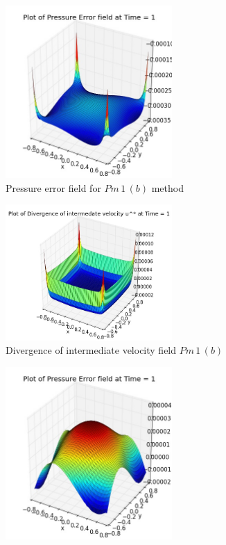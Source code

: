 \begin{figure}[H]
	\centering
	\begin{subfigure}[t]{2.5in}
		\centering
		\includegraphics[width=2.5in]{figures/Pm1b_unf1_np_P_error_t_1_grid_60.jpg}
		\caption{Pressure error field for $Pm\,1\,(b)$ method}\label{fig:6.19a}		
	\end{subfigure}
	\quad
	\begin{subfigure}[t]{2.5in}
		\centering
		\includegraphics[width=2.5in]{figures/Pm1b_unf1_np_div_uvstar_t_1_grid_60.jpg}
		\caption{Divergence of intermediate velocity field $Pm\,1\,(b)$}\label{fig:6.19b}
	\end{subfigure}
	\quad
	\centering
	\begin{subfigure}[t]{2.5in}
		\centering
		\includegraphics[width=2.5in]{figures/Pm2_unf1_np_P_error_t_1_grid_60.jpg}

\end{subfigure}
\end{figure}
